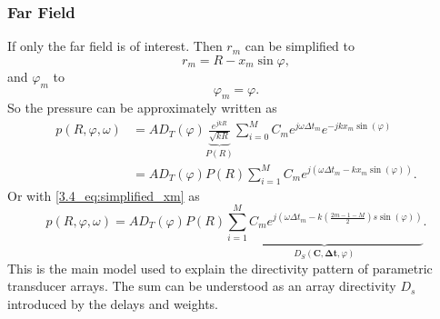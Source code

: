 \subsubsection{Far Field}
If only the far field is of interest. Then $r_{m}$ can be simplified to \cite{alma99116706330905515}
\begin{equation}
    r_{m} = R - x_m \sin{\varphi},
\end{equation}
and $\varphi_m$ to
\begin{equation}
    \varphi_m = \varphi.
\end{equation}
So the pressure can be approximately written as
\begin{align}
    p(R,\varphi,\omega) 
    &= 
     A D_T(\varphi) \underbrace{\frac{e^{j k R}}{\sqrt{k R}}}_{P(R)} \sum_{i=0}^M C_m e^{j\omega \Delta t_m}e^{-jkx_m\sin{(\varphi)}} \\
    &= 
    A D_T(\varphi) P(R) \sum_{i=1}^M C_m e^{j(\omega \Delta t_m - kx_m\sin{(\varphi)})}.
\end{align}
Or with \ref{3.4_eq:simplified_xm} as
\begin{equation}
    p(R,\varphi,\omega) 
    = 
    A D_T(\varphi) P(R) \underbrace{\sum_{i=1}^M C_m e^{j (\omega \Delta t_m -k \left ( \frac{2m -1 - M}{2} \right )s \sin{(\varphi)} )}}_{D_S(\bm{C}, \bm{\Delta t} , \varphi)}.
    \label{3_eq:beam_model_final}
\end{equation}
This is the main model used to explain the directivity pattern of parametric transducer arrays. The sum can be understood as an array directivity $D_s$ introduced by the delays and weights. 

